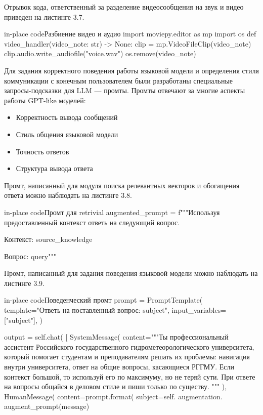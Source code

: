 
Отрывок кода, ответственный за разделение видеосообщения на звук и видео
приведен на листинге 3.7.

\begin{codepiece}{in-place code}{Разбиение видео и аудио}
    import moviepy.editor as mp
    import os
    def video_handler(video_note: str) -> None:
        clip = mp.VideoFileClip(video_note)
        clip.audio.write_audiofile("voice.wav")
        os.remove(video_note)
\end{codepiece}


Для задания корректного поведения работы языковой модели и определения стиля
коммуникации с конечным пользователем были разработаны специальные
запросы-подсказки для LLM --- промты. Промты отвечают за многие аспекты работы
GPT-like моделей: 

\begin{itemize}
    \item Корректность вывода сообщений
    \item Стиль общения языковой модели
    \item Точность ответов
    \item Структура вывода ответа
\end{itemize}

Промт, написанный для модуля поиска релевантных векторов и обогащения ответа
можно наблюдать на листинге 3.8.

\begin{codepiece}{in-place code}{Промт для retrivial}
     augmented_prompt = f"""Используя предоставленный контекст ответь на следующий вопрос.

     Контекст:
     {source_knowledge}

     Вопрос: {query}"""
\end{codepiece}

Промт, написанный для задания поведения языковой модели можно наблюдать на 
листинге 3.9.

\begin{codepiece}{in-place code}{Поведенческий промт}
        prompt = PromptTemplate(
            template="Ответь на поставленный вопрос: {subject}",
            input_variables=["subject"],
        )

        output = self.chat(
            [
                SystemMessage(
                    content="""Ты профессиональный ассистент Российского
                    государственного гидрометеорологического университета,
                    который помогает студентам и преподавателям решать их
                    проблемы: навигация внутри университета, ответ на общие
                    вопросы, касающиеся РГГМУ. Если контекст большой, то
                    используй его по максимуму, но не теряй сути.
                    При ответе на вопросы общайся в деловом стиле и пиши
                    только по существу. """
                ),
                HumanMessage(
                    content=prompt.format(
                        subject=self.
                        augmentation.
                        augment_prompt(message)
\end{codepiece}

